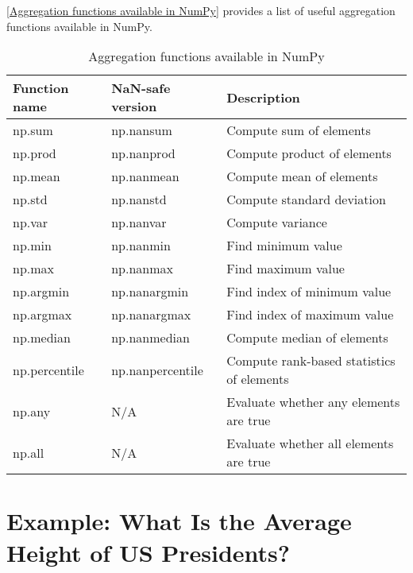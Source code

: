 \autoref{Aggregation functions available in NumPy} provides a list of useful aggregation functions available in NumPy.
\begin{table}
    \centering
    \caption{Aggregation functions available in NumPy}
    \label{Aggregation functions available in NumPy}
    \begin{tabular}{lll}
        \hline
        Function name & NaN-safe version & Description                               \\
        \hline
        np.sum        & np.nansum        & Compute sum of elements                   \\
        np.prod       & np.nanprod       & Compute product of elements               \\
        np.mean       & np.nanmean       & Compute mean of elements                  \\
        np.std        & np.nanstd        & Compute standard deviation                \\
        np.var        & np.nanvar        & Compute variance                          \\
        np.min        & np.nanmin        & Find minimum value                        \\
        np.max        & np.nanmax        & Find maximum value                        \\
        np.argmin     & np.nanargmin     & Find index of minimum value               \\
        np.argmax     & np.nanargmax     & Find index of maximum value               \\
        np.median     & np.nanmedian     & Compute median of elements                \\
        np.percentile & np.nanpercentile & Compute rank-based statistics of elements \\
        np.any        & N/A              & Evaluate whether any elements are true    \\
        np.all        & N/A              & Evaluate whether all elements are true    \\
        \hline
    \end{tabular}
\end{table}
\section{Example: What Is the Average Height of US Presidents?}